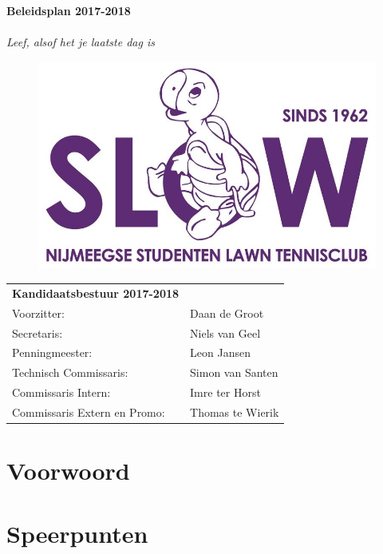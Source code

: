 \documentclass[]{article}
\begin{document}
\begin{titlepage}
	\centering
	{\bfseries\Huge
	Beleidsplan 2017-2018\\}
	\textit{\\\large Leef, alsof het je laatste dag is}
	\begin{figure}[h]
		\includegraphics[scale=0.6]{beleidsplan1}
	\end{figure}
	\vfill
	\flushleft
	{
		\begin{table}[h]
			\begin{tabular}{ll}
				\textbf{Kandidaatsbestuur 2017-2018}\\
				Voorzitter:                 & Daan de Groot    \\
				Secretaris:                 & Niels van Geel   \\
				Penningmeester:             & Leon Jansen      \\
				Technisch Commissaris:       & Simon van Santen \\
				Commissaris Intern:          & Imre ter Horst   \\
				Commissaris Extern en Promo: & Thomas te Wierik
			\end{tabular}
		\end{table}
	}
\end{titlepage}
\section*{Voorwoord}

\clearpage
{}
\tableofcontents

\section{Speerpunten}
\end{document}
